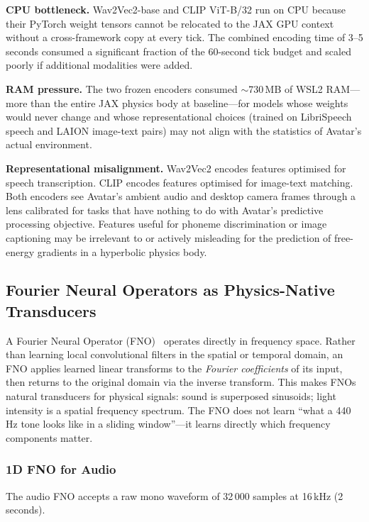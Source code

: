 \textbf{CPU bottleneck.}
Wav2Vec2-base and CLIP ViT-B/32 run on CPU because their PyTorch weight tensors cannot
be relocated to the JAX GPU context without a cross-framework copy at every tick.
The combined encoding time of 3--5 seconds consumed a significant fraction of the
60-second tick budget and scaled poorly if additional modalities were added.

\textbf{RAM pressure.}
The two frozen encoders consumed $\sim$730\,MB of WSL2 RAM---more than the entire
JAX physics body at baseline---for models whose weights would never change and whose
representational choices (trained on LibriSpeech speech and LAION image-text pairs)
may not align with the statistics of Avatar's actual environment.

\textbf{Representational misalignment.}
Wav2Vec2 encodes features optimised for speech transcription.
CLIP encodes features optimised for image-text matching.
Both encoders see Avatar's ambient audio and desktop camera frames through a lens
calibrated for tasks that have nothing to do with Avatar's predictive processing
objective.
Features useful for phoneme discrimination or image captioning may be irrelevant to
or actively misleading for the prediction of free-energy gradients in a hyperbolic
physics body.

\subsection{Fourier Neural Operators as Physics-Native Transducers}
\label{sec:fno}

A Fourier Neural Operator (FNO)~\cite{fno2020} operates directly in frequency space.
Rather than learning local convolutional filters in the spatial or temporal domain, an
FNO applies learned linear transforms to the \emph{Fourier coefficients} of its input,
then returns to the original domain via the inverse transform.
This makes FNOs natural transducers for physical signals: sound is superposed
sinusoids; light intensity is a spatial frequency spectrum.
The FNO does not learn ``what a 440\,Hz tone looks like in a sliding window''---it
learns directly which frequency components matter.

\subsubsection{1D FNO for Audio}
\label{sec:fno_audio}

The audio FNO accepts a raw mono waveform of 32\,000 samples at 16\,kHz (2 seconds).

